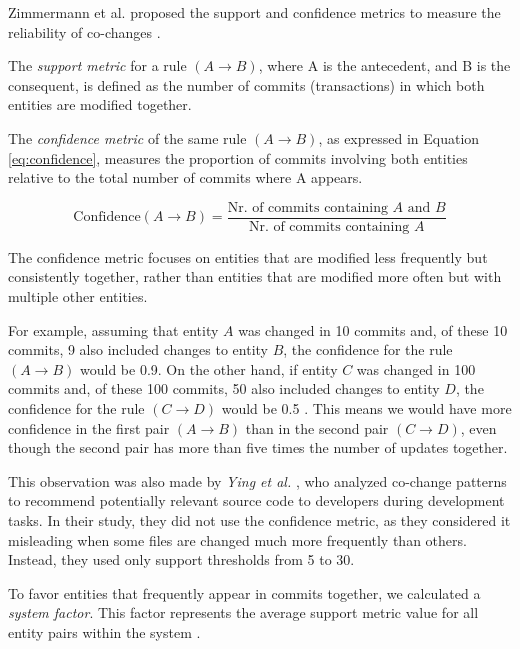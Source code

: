Zimmermann et al. proposed the support and confidence metrics to measure the reliability of co-changes \cite{Zimmermann:2004:MVH:998675.999460}.

The \textit{support metric} for a rule $(A \rightarrow B)$, where A is the antecedent, and B is the consequent, is defined as the number of commits (transactions) in which both entities are modified together.

The \textit{confidence metric} of the same rule $(A \rightarrow B)$, as expressed in Equation \eqref{eq:confidence}, measures the proportion of commits involving both entities relative to the total number of commits where A appears.

\begin{equation}
\text{Confidence}(A \rightarrow B) = \frac{\text{Nr. of commits containing } A \text{ and } B}{\text{Nr. of commits containing } A}
\label{eq:confidence}
\end{equation}


The confidence metric focuses on entities that are modified less frequently but consistently together, rather than entities that are modified more often but with multiple other entities.

For example, assuming that entity \( A \) was changed in 10 commits and, of these 10 commits, 9 also included changes to entity \( B \), the confidence for the rule \( (A \rightarrow B) \) would be 0.9. On the other hand, if entity \( C \) was changed in 100 commits and, of these 100 commits, 50 also included changes to entity \( D \), the confidence for the rule \( (C \rightarrow D) \) would be 0.5 \cite{cluster-access}. This means we would have more confidence in the first pair \( (A \rightarrow B) \) than in the second pair \( (C \rightarrow D) \), even though the second pair has more than five times the number of updates together.


This observation was also made by \textit{Ying et al.} \cite{Ying-co-change}, who analyzed co-change patterns to recommend potentially relevant source code to developers during development tasks. In their study, they did not use the confidence metric, as they considered it misleading when some files are changed much more frequently than others. Instead, they used only support thresholds from 5 to 30.
 

To favor entities that frequently appear in commits together, we calculated a \textit{system factor}. This factor represents the average support metric value for all entity pairs within the system \cite{cluster-access}.

